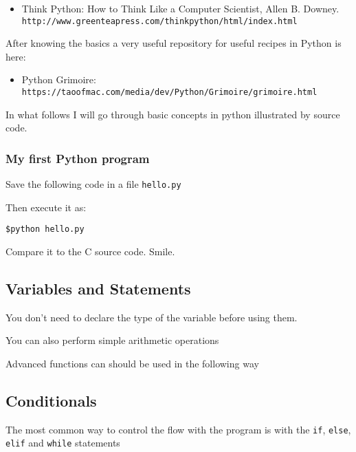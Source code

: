 \documentclass{article}
\begin{document}
\begin{itemize}
\item Think Python: How to Think Like a Computer Scientist, Allen
  B. Downey.\\\verb"http://www.greenteapress.com/thinkpython/html/index.html" 
\end{itemize}

After knowing the basics a very useful repository for useful recipes
in Python is here:

\begin{itemize}
\item Python Grimoire: \\\verb"https://taoofmac.com/media/dev/Python/Grimoire/grimoire.html"
\end{itemize}

In what follows I will go through basic concepts in python illustrated
by source code.

\subsubsection{My first Python program}

Save the following code in a file \verb"hello.py"


Then execute it as:
\begin{verbatim}
$python hello.py
\end{verbatim}

Compare it to the C source code. Smile.

\subsection{Variables and Statements}
You don't need to declare the type of the variable before using them. 
 



You can also perform simple arithmetic operations


Advanced functions can should be used in the following way



\subsection{Conditionals}
The most common way to control the flow with the program is with the
\verb"if", \verb"else", \verb"elif" and \verb"while" statements
\end{document}
